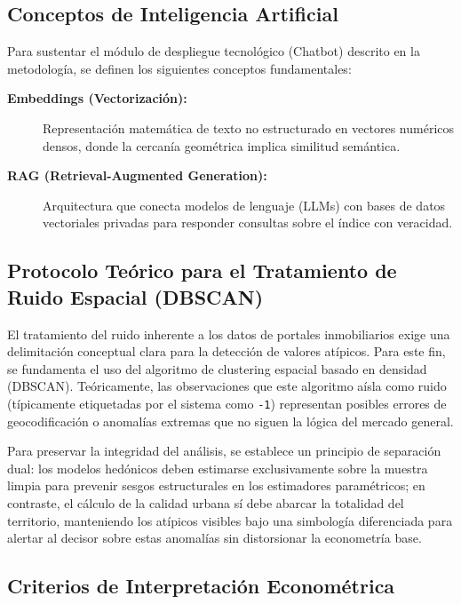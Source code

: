 \documentclass[12pt, a4paper, twoside, openright]{report}
\theoremstyle{plain}
\theoremstyle{definition}
\begin{document}

\subsection{Conceptos de Inteligencia Artificial}
Para sustentar el módulo de despliegue tecnológico (Chatbot) descrito en la metodología, se definen los siguientes conceptos fundamentales:

\begin{description}
    \item[\textbf{Embeddings (Vectorización):}] Representación matemática de texto no estructurado en vectores numéricos densos, donde la cercanía geométrica implica similitud semántica.
    \item[\textbf{RAG (Retrieval-Augmented Generation):}] Arquitectura que conecta modelos de lenguaje (LLMs) con bases de datos vectoriales privadas para responder consultas sobre el índice con veracidad.
\end{description}

\subsection{Protocolo Teórico para el Tratamiento de Ruido Espacial (DBSCAN)}
\label{subsec:dbscan_outliers}

El tratamiento del ruido inherente a los datos de portales inmobiliarios exige una delimitación conceptual clara para la detección de valores atípicos. Para este fin, se fundamenta el uso del algoritmo de clustering espacial basado en densidad (DBSCAN). Teóricamente, las observaciones que este algoritmo aísla como ruido (típicamente etiquetadas por el sistema como \texttt{-1}) representan posibles errores de geocodificación o anomalías extremas que no siguen la lógica del mercado general. 

Para preservar la integridad del análisis, se establece un principio de separación dual: los modelos hedónicos deben estimarse exclusivamente sobre la muestra limpia para prevenir sesgos estructurales en los estimadores paramétricos; en contraste, el cálculo de la calidad urbana  sí debe abarcar la totalidad del territorio, manteniendo los atípicos visibles bajo una simbología diferenciada para alertar al decisor sobre estas anomalías sin distorsionar la econometría base.

\subsection{Criterios de Interpretación Econométrica}
\label{subsec:lectura_rlm}
\end{document}
